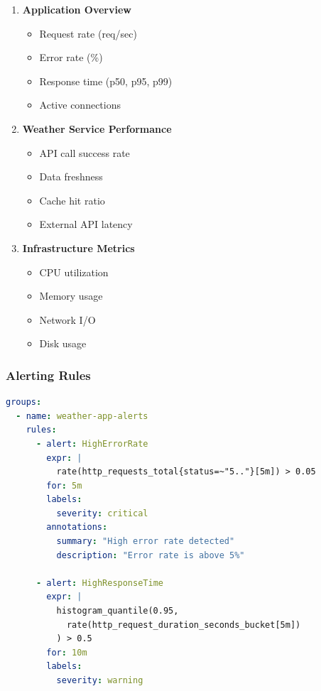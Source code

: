 \documentclass[12pt,a4paper]{article}
\begin{document}
\begin{enumerate}
    \item \textbf{Application Overview}
    \begin{itemize}
        \item Request rate (req/sec)
        \item Error rate (\%)
        \item Response time (p50, p95, p99)
        \item Active connections
    \end{itemize}
    
    \item \textbf{Weather Service Performance}
    \begin{itemize}
        \item API call success rate
        \item Data freshness
        \item Cache hit ratio
        \item External API latency
    \end{itemize}
    
    \item \textbf{Infrastructure Metrics}
    \begin{itemize}
        \item CPU utilization
        \item Memory usage
        \item Network I/O
        \item Disk usage
    \end{itemize}
\end{enumerate}

\subsubsection{Alerting Rules}

\begin{lstlisting}[language=yaml, caption=Prometheus Alert Rules]
groups:
  - name: weather-app-alerts
    rules:
      - alert: HighErrorRate
        expr: |
          rate(http_requests_total{status=~"5.."}[5m]) > 0.05
        for: 5m
        labels:
          severity: critical
        annotations:
          summary: "High error rate detected"
          description: "Error rate is above 5%"
      
      - alert: HighResponseTime
        expr: |
          histogram_quantile(0.95, 
            rate(http_request_duration_seconds_bucket[5m])
          ) > 0.5
        for: 10m
        labels:
          severity: warning
\end{lstlisting}
\end{document}
